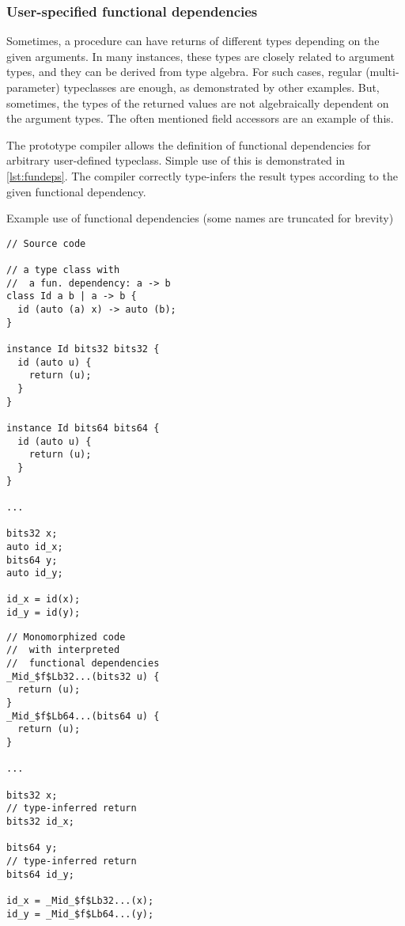 \subsubsection{User-specified functional dependencies}
\label{sec:uspecFD}

Sometimes, a procedure can have returns of different types depending on the given arguments. In many instances, these types are closely related to argument types, and they can be derived from type algebra. For such cases, regular (multi-parameter) typeclasses are enough, as demonstrated by other examples. But, sometimes, the types of the returned values are not algebraically dependent on the argument types. The often mentioned field accessors are an example of this.

The prototype compiler allows the definition of functional dependencies for arbitrary user-defined typeclass. Simple use of this is demonstrated in \cref{lst:fundeps}. The compiler correctly type-infers the result types according to the given functional dependency.

\begin{codex}
    \caption{Example use of functional dependencies (some names are truncated for brevity)}
    \label{lst:fundeps}
    \begin{center}
    \begin{minipage}{0.5\linewidth}
    \begin{lstlisting}[basicstyle=\scriptsize\ttfamily]
// Source code

// a type class with
//  a fun. dependency: a -> b
class Id a b | a -> b {
  id (auto (a) x) -> auto (b);
}

instance Id bits32 bits32 {
  id (auto u) {
    return (u);
  }
}

instance Id bits64 bits64 {
  id (auto u) {
    return (u);
  }
}

...

bits32 x;
auto id_x;
bits64 y;
auto id_y;

id_x = id(x);
id_y = id(y);
    \end{lstlisting}
    \end{minipage}%
    \begin{minipage}{0.5\linewidth}
    \begin{lstlisting}[basicstyle=\scriptsize\ttfamily]
// Monomorphized code
//  with interpreted
//  functional dependencies
_Mid_$f$Lb32...(bits32 u) {
  return (u);
}
_Mid_$f$Lb64...(bits64 u) {
  return (u);
}

...

bits32 x;
// type-inferred return
bits32 id_x;

bits64 y;
// type-inferred return
bits64 id_y;

id_x = _Mid_$f$Lb32...(x);
id_y = _Mid_$f$Lb64...(y);
    \end{lstlisting}
    \end{minipage}
    \end{center}
\end{codex}

